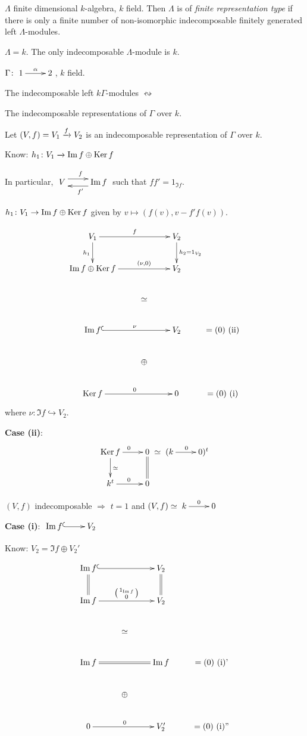 \begin{defin}
$\Lambda$ finite dimensional $k$-algebra, $k$ field.  Then $\Lambda$
is of \emph{finite representation type} if there is only a finite number of non-isomorphic
indecomposable finitely generated left $\Lambda$-modules.
\end{defin}

\begin{exam}
$\Lambda = k$.  The only indecomposable $\Lambda$-module is $k$. 
\end{exam}

\begin{exam}
$\Gamma\colon \xymatrix{1\ar[r]^\alpha & 2}$, $k$ field.

The indecomposable left $k\Gamma$-modules $\leftrightsquigarrow$ \parbox{6cm}{The
indecomposable representations of $\Gamma$ over $k$.} 

Let $(V,f) = V_1\xrightarrow{f} V_2$ is an indecomposable representation of
$\Gamma$ over $k$.

Know: $h_1\colon V_1 \xrightarrow{~} \operatorname{Im}\nolimits f\oplus \operatorname{Ker}\nolimits f$

In particular, $\xymatrix{V\ar@<1ex>[r]^f & \Im f\ar@<1ex>[l]^{f'}}$
such that $ff' = 1_{\Im f}$.

$h_1\colon V_1 \to \operatorname{Im}\nolimits f \oplus \operatorname{Ker}\nolimits f$ given by $v\mapsto (f(v), v -
f'f(v))$. 

\[\xymatrix{
V_1 \ar[rr]^f \ar[d]_{h_1} & &  V_2\ar[d]^{h_2=1_{V_2}} & \\
\Im f\oplus \Ker f \ar[rr]^-{(\nu,0)} & & V_2 & \\
& \simeq & & \\
\Im f\ar@{^(->}[rr]^\nu && V_2 & =(0) \text{\ (ii)}\\
 & \oplus & \\
\Ker f \ar[rr]^0 && 0 & = (0) \text{\ (i)}
}\]
where $\nu\colon \Im f \hookrightarrow V_2$.

\textbf{Case (ii)}: \[\xymatrix{
\Ker f \ar[r]^0\ar[d]^\simeq & 0\ar@{=}[d]\\
k^t \ar[r]^0 & 0} \simeq \xymatrix{(k\ar[r]^0 & 0)^t}\]

$(V,f)$ indecomposable $\Rightarrow$ $t = 1$ and $(V,f)\simeq
\xymatrix{k\ar[r]^0 & 0}$ 

\textbf{Case (i)}: $\xymatrix{\Im f \ar@{^(->}[r] & V_2}$

Know: $V_2 = \Im f\oplus V_2'$

\[\xymatrix{
\Im f \ar@{^(->}[rr] \ar@{=}[d] & &  V_2\ar@{=}[d] & \\
\Im f \ar[rr]^-{\left(\begin{smallmatrix}1_{\Im f} \\ 0\end{smallmatrix}\right)} & & V_2 & \\
& \simeq & & \\
\Im f\ar@{=}[rr] && \Im f & =(0) \text{\ (i)'}\\
 & \oplus & \\
0\ar[rr]^0 && V'_2 & = (0) \text{\ (i)''}
}\]


\end{exam}
